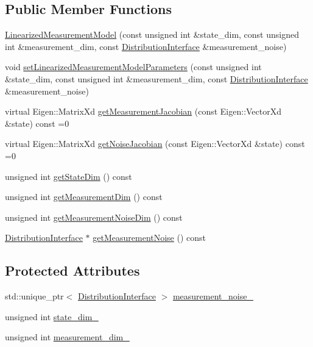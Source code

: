 \subsection*{Public Member Functions}
\begin{DoxyCompactItemize}
\item 
\hyperlink{classrefill_1_1LinearizedMeasurementModel_ade8947f23e677e3a611c4e4e1be60a73}{Linearized\+Measurement\+Model} (const unsigned int \&state\+\_\+dim, const unsigned int \&measurement\+\_\+dim, const \hyperlink{classrefill_1_1DistributionInterface}{Distribution\+Interface} \&measurement\+\_\+noise)
\item 
void \hyperlink{classrefill_1_1LinearizedMeasurementModel_a727f747799d41004eb934d063c7818b0}{set\+Linearized\+Measurement\+Model\+Parameters} (const unsigned int \&state\+\_\+dim, const unsigned int \&measurement\+\_\+dim, const \hyperlink{classrefill_1_1DistributionInterface}{Distribution\+Interface} \&measurement\+\_\+noise)
\item 
virtual Eigen\+::\+Matrix\+Xd \hyperlink{classrefill_1_1LinearizedMeasurementModel_a1a9fbbf32f4e71b666ee6609cdc99da7}{get\+Measurement\+Jacobian} (const Eigen\+::\+Vector\+Xd \&state) const =0
\item 
virtual Eigen\+::\+Matrix\+Xd \hyperlink{classrefill_1_1LinearizedMeasurementModel_a3573eb964dd7bff58b05af85fa46a8a0}{get\+Noise\+Jacobian} (const Eigen\+::\+Vector\+Xd \&state) const =0
\item 
unsigned int \hyperlink{classrefill_1_1LinearizedMeasurementModel_aed8dd3245704f8e4da22ea7a2aa76eda}{get\+State\+Dim} () const 
\item 
unsigned int \hyperlink{classrefill_1_1LinearizedMeasurementModel_a75254cd8533f1d7cf15ab0135903e4e0}{get\+Measurement\+Dim} () const 
\item 
unsigned int \hyperlink{classrefill_1_1LinearizedMeasurementModel_a389e47cdf14ca24528affbafdd7e5c67}{get\+Measurement\+Noise\+Dim} () const 
\item 
\hyperlink{classrefill_1_1DistributionInterface}{Distribution\+Interface} $\ast$ \hyperlink{classrefill_1_1LinearizedMeasurementModel_a320cf84380a5a4f03a6cacee8ef74bf6}{get\+Measurement\+Noise} () const 
\end{DoxyCompactItemize}
\subsection*{Protected Attributes}
\begin{DoxyCompactItemize}
\item 
std\+::unique\+\_\+ptr$<$ \hyperlink{classrefill_1_1DistributionInterface}{Distribution\+Interface} $>$ \hyperlink{classrefill_1_1LinearizedMeasurementModel_ac15f42823cd7fb338ea5bd79e528627a}{measurement\+\_\+noise\+\_\+}
\item 
unsigned int \hyperlink{classrefill_1_1LinearizedMeasurementModel_aff98ef53117db9491cff63baa48cdafd}{state\+\_\+dim\+\_\+}
\item 
unsigned int \hyperlink{classrefill_1_1LinearizedMeasurementModel_a45474ea2dc1ca250805ee69c45dad6f3}{measurement\+\_\+dim\+\_\+}
\end{DoxyCompactItemize}


